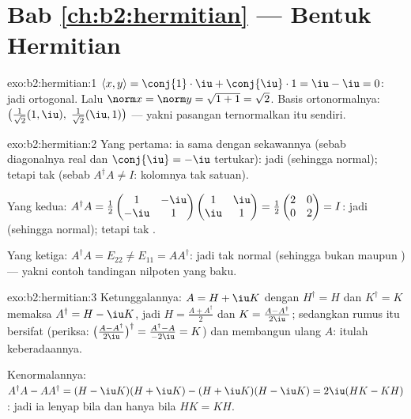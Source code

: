 \section*{Bab \ref{ch:b2:hermitian} --- Bentuk Hermitian}

\begin{solution}{exo:b2:hermitian:1}
$\langle x, y\rangle = \conj{1}\cdot\iu + \conj{\iu}\cdot 1 = \iu -
\iu = 0$: jadi ortogonal. Lalu $\norm x = \norm y = \sqrt{1 + 1} = \sqrt2$.
Basis ortonormalnya: $\bigl(\frac{1}{\sqrt2}(1, \iu),\;
\frac{1}{\sqrt2}(\iu, 1)\bigr)$ --- yakni pasangan ternormalkan itu sendiri.
\end{solution}

\begin{solution}{exo:b2:hermitian:2}
Yang pertama: ia sama dengan  sekawannya (sebab diagonalnya real dan
$\conj{\iu} = -\iu$ tertukar): jadi  (sehingga normal); tetapi tak
 (sebab $A^\dagger A \neq I$: kolomnya tak satuan).

Yang kedua: $A^\dagger A = \frac12\begin{pmatrix} 1 & -\iu\\ -\iu &
1\end{pmatrix}\begin{pmatrix} 1 & \iu\\ \iu & 1\end{pmatrix} =
\frac12\begin{pmatrix} 2 & 0\\ 0 & 2\end{pmatrix} = I$: jadi 
(sehingga normal); tetapi tak .

Yang ketiga: $A^\dagger A = E_{22} \neq E_{11} = AA^\dagger$: jadi tak normal
(sehingga bukan  maupun ) --- yakni contoh tandingan
nilpoten yang baku.
\end{solution}

\begin{solution}{exo:b2:hermitian:3}
Ketunggalannya: $A = H + \iu K$ dengan $H^\dagger = H$ dan $K^\dagger = K$
memaksa $A^\dagger = H - \iu K$, jadi $H = \frac{A + A^\dagger}{2}$ dan
$K = \frac{A - A^\dagger}{2\iu}$; sedangkan rumus itu bersifat 
(periksa: $\bigl(\frac{A - A^\dagger}{2\iu}\bigr)^\dagger = \frac{
A^\dagger - A}{-2\iu} = K$) dan membangun ulang $A$: itulah keberadaannya.

Kenormalannya: $A^\dagger A - AA^\dagger = (H - \iu K)(H + \iu K) - (H
+ \iu K)(H - \iu K) = 2\iu(HK - KH)$: jadi ia lenyap bila dan hanya bila $HK = KH$.
\end{solution}

